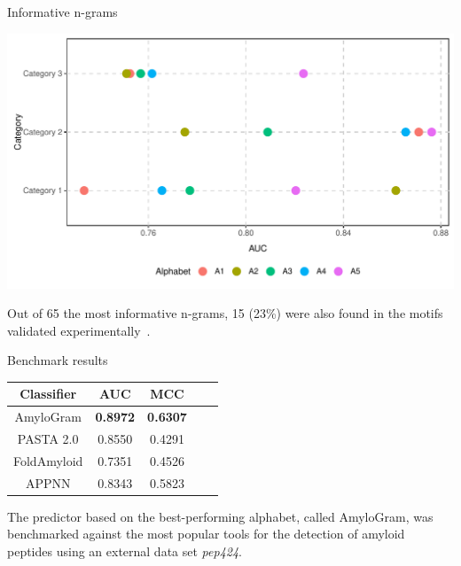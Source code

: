 \documentclass{beamer}\usepackage[]{graphicx}\usepackage[]{color}
\makeatletter
\def\maxwidth{ %
  \ifdim\Gin@nat@width>\linewidth
    \linewidth
  \else
    \Gin@nat@width
  \fi
}
\newenvironment{knitrout}{}{} %
\makeatother
\begin{document}
\begin{frame}{Informative n-grams}
\begin{knitrout}
\color{fgcolor}

{\centering \includegraphics[width=\maxwidth]{figure/unnamed-chunk-18-1} 

}



\end{knitrout}

Out of 65 the most informative n-grams, 15 (23\%) were also found in the motifs validated experimentally~\citep{paz_sequence_2004}.
\end{frame}


\begin{frame}{Benchmark results}

\begin{table}[ht]
\centering

\begin{tabular}{ccccc}
  \toprule
Classifier & AUC & MCC \\ 
  \midrule
AmyloGram & \textbf{0.8972} & \textbf{0.6307} \\ 
  \rowcolor{white}PASTA 2.0 \citep{walsh_pasta_2014} & 0.8550 & 0.4291  \\ 
   FoldAmyloid \citep{garbuzynskiy_foldamyloid:_2010} & 0.7351 & 0.4526  \\ 
  \rowcolor{white}APPNN \citep{familia_prediction_2015} & 0.8343 & 0.5823  \\ 
   \bottomrule
\end{tabular}
\end{table}

The predictor based on the best-performing alphabet, called AmyloGram, was benchmarked against the most popular tools for the detection of amyloid peptides using an external data set \textit{pep424}.

\footnotesize

\end{frame}
\end{document}
